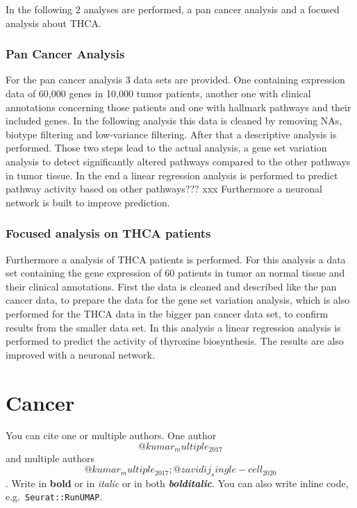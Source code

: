 \documentclass[
  parskip,
  oneside]{scrreprt}
\begin{document}
In the following 2 analyses are performed, a pan cancer analysis and a
focused analysis about THCA.

\hypertarget{pan-cancer-analysis}{%
\subsubsection{Pan Cancer Analysis}\label{pan-cancer-analysis}}

For the pan cancer analysis 3 data sets are provided. One containing
expression data of 60,000 genes in 10,000 tumor patients, another one
with clinical annotations concerning those patients and one with
hallmark pathways and their included genes. In the following analysis
this data is cleaned by removing NAs, biotype filtering and low-variance
filtering. After that a descriptive analysis is performed. Those two
steps lead to the actual analysis, a gene set variation analysis to
detect significantly altered pathways compared to the other pathways in
tumor tissue. In the end a linear regression analysis is performed to
predict pathway activity based on other pathways??? xxx Furthermore a
neuronal network is built to improve prediction.

\hypertarget{focused-analysis-on-thca-patients}{%
\subsubsection{Focused analysis on THCA
patients}\label{focused-analysis-on-thca-patients}}

Furthermore a analysis of THCA patients is performed. For this analysis
a data set containing the gene expression of 60 patients in tumor an
normal tissue and their clinical annotations. First the data is cleaned
and described like the pan cancer data, to prepare the data for the gene
set variation analysis, which is also performed for the THCA data in the
bigger pan cancer data set, to confirm results from the smaller data
set. In this analysis a linear regression analysis is performed to
predict the activity of thyroxine biosynthesis. The results are also
improved with a neuronal network.

\hypertarget{cancer}{%
\section{Cancer}\label{cancer}}

You can cite one or multiple authors. One author
\[@kumar_multiple_2017\] and multiple authors
\[@kumar_multiple_2017; @zavidij_single-cell_2020\]. Write in
\textbf{bold} or in \emph{italic} or in both \textbf{\emph{bolditalic}}.
You can also write inline code, e.g.~\texttt{Seurat::RunUMAP}.
\end{document}
